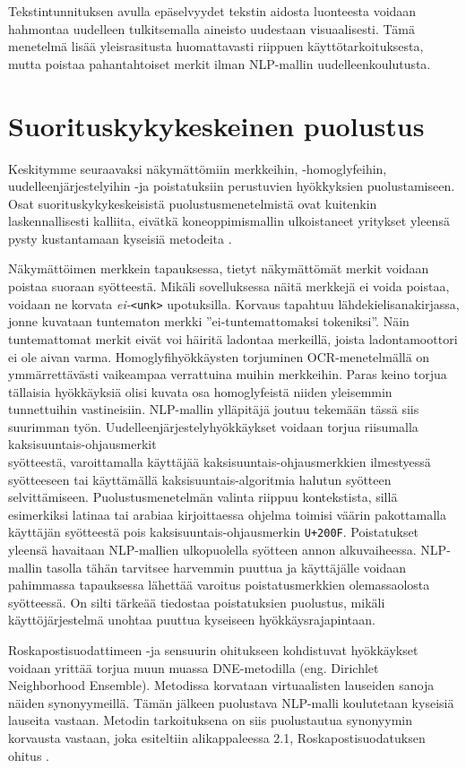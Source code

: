Tekstintunnituksen avulla epäselvyydet tekstin aidosta luonteesta voidaan hahmontaa uudelleen tulkitsemalla aineisto uudestaan visuaalisesti. Tämä menetelmä lisää yleisrasitusta huomattavasti riippuen käyttötarkoituksesta, mutta poistaa pahantahtoiset merkit ilman NLP-mallin uudelleenkoulutusta. \citep{boucher2021bad}

\section{Suorituskykykeskeinen puolustus}
Keskitymme seuraavaksi näkymättömiin merkkeihin, -homoglyfeihin, \-uudelleenjärjestelyihin -ja poistatuksiin perustuvien hyökkyksien puolustamiseen. Osat suorituskykykeskeisistä puolustusmenetelmistä ovat kuitenkin laskennallisesti kalliita, eivätkä koneoppimismallin ulkoistaneet yritykset yleensä pysty kustantamaan kyseisiä metodeita \citep{https://doi.org/10.48550/arxiv.1911.07399}.

Näkymättöimen merkkein tapauksessa, tietyt näkymättömät merkit voidaan poistaa suoraan syötteestä. Mikäli sovelluksessa näitä merkkejä ei voida poistaa, voidaan ne korvata \textit{ei-}\texttt{<unk>} upotuksilla. Korvaus tapahtuu lähdekielisanakirjassa, jonne kuvataan tuntematon merkki ''ei-tuntemattomaksi tokeniksi''. Näin tuntemattomat merkit eivät voi häiritä ladontaa merkeillä, joista ladontamoottori ei ole aivan varma. Homoglyfihyökkäysten torjuminen OCR-menetelmällä on ymmärrettävästi vaikeampaa verrattuina muihin merkkeihin. Paras keino torjua tällaisia hyökkäyksiä olisi kuvata osa homoglyfeistä niiden yleisemmin tunnettuihin vastineisiin. NLP-mallin ylläpitäjä joutuu tekemään tässä siis suurimman työn. Uudelleenjärjestelyhyökkäykset voidaan torjua riisumalla kaksisuuntais-ohjausmerkit\\syötteestä, varoittamalla käyttäjää kaksisuuntais-ohjausmerkkien ilmestyessä syötteeseen tai käyttämällä kaksisuuntais-algoritmia halutun syötteen selvittämiseen. Puolustusmenetelmän valinta riippuu kontekstista, sillä esimerkiksi latinaa tai arabiaa kirjoittaessa ohjelma toimisi väärin pakottamalla käyttäjän syötteestä pois kaksisuuntais-ohjausmerkin \texttt{U+200F}. Poistatukset yleensä havaitaan NLP-mallien ulkopuolella syötteen annon alkuvaiheessa. NLP-mallin tasolla tähän tarvitsee harvemmin puuttua ja käyttäjälle voidaan pahimmassa tapauksessa lähettää varoitus poistatusmerkkien olemassaolosta syötteessä. On silti tärkeää tiedostaa poistatuksien puolustus, mikäli käyttöjärjestelmä unohtaa puuttua kyseiseen hyökkäysrajapintaan. \citep{boucher2021bad}

Roskapostisuodattimeen -ja sensuurin ohitukseen kohdistuvat hyökkäykset voidaan yrittää torjua muun muassa DNE-metodilla (eng. Dirichlet Neighborhood Ensemble). Metodissa korvataan virtuaalisten lauseiden sanoja näiden synonyymeillä. Tämän jälkeen puolustava NLP-malli koulutetaan kyseisiä lauseita vastaan. Metodin tarkoituksena on siis puolustautua synonyymin korvausta vastaan, joka esiteltiin alikappaleessa 2.1, Roskapostisuodatuksen ohitus \citep{dnedefense}.